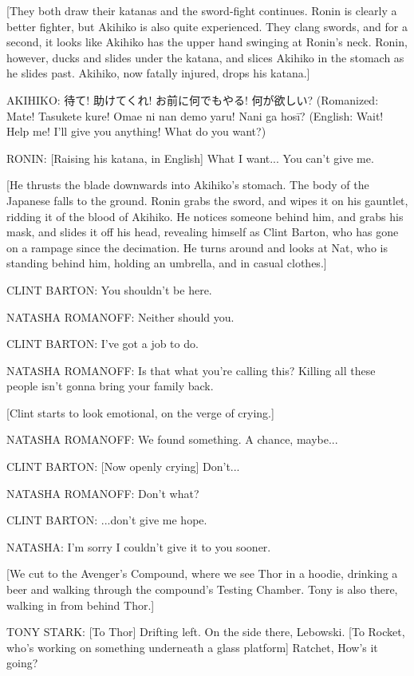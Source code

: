 [They both draw their katanas and the sword-fight continues. Ronin is clearly a better fighter, but Akihiko is also quite experienced. They clang swords, and for a second, it looks like Akihiko has the upper hand swinging at Ronin's neck. Ronin, however, ducks and slides under the katana, and slices Akihiko in the stomach as he slides past. Akihiko, now fatally injured, drops his katana.]

AKIHIKO: 待て! 助けてくれ! お前に何でもやる! 何が欲しい? (Romanized: Mate! Tasukete kure! Omae ni nan demo yaru! Nani ga hosī? (English: Wait! Help me! I'll give you anything! What do you want?)

RONIN: [Raising his katana, in English] What I want... You can't give me.

[He thrusts the blade downwards into Akihiko's stomach. The body of the Japanese falls to the ground. Ronin grabs the sword, and wipes it on his gauntlet, ridding it of the blood of Akihiko. He notices someone behind him, and grabs his mask, and slides it off his head, revealing himself as Clint Barton, who has gone on a rampage since the decimation. He turns around and looks at Nat, who is standing behind him, holding an umbrella, and in casual clothes.]

CLINT BARTON: You shouldn't be here.

NATASHA ROMANOFF: Neither should you.

CLINT BARTON: I've got a job to do.

NATASHA ROMANOFF: Is that what you're calling this? Killing all these people isn't gonna bring your family back.

[Clint starts to look emotional, on the verge of crying.]

NATASHA ROMANOFF: We found something. A chance, maybe...

CLINT BARTON: [Now openly crying] Don't...

NATASHA ROMANOFF: Don't what?

CLINT BARTON: ...don't give me hope.

NATASHA: I'm sorry I couldn't give it to you sooner.

[We cut to the Avenger's Compound, where we see Thor in a hoodie, drinking a beer and walking through the compound's Testing Chamber. Tony is also there, walking in from behind Thor.]

TONY STARK: [To Thor] Drifting left. On the side there, Lebowski. [To Rocket, who's working on something underneath a glass platform] Ratchet, How's it going?

